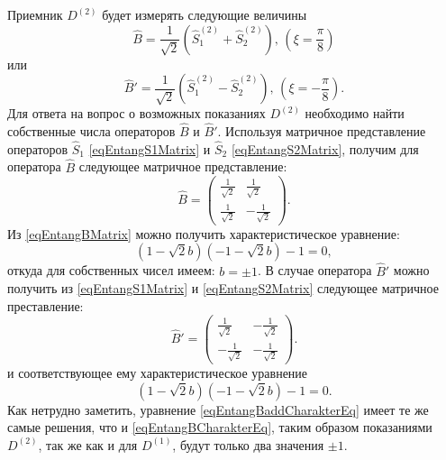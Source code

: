 Приемник $D^{(2)}$ будет измерять следующие величины 
\[
\hat{B} = \frac{1}{\sqrt{2}}\left(\hat{S}_1^{(2)} + \hat{S}_2^{(2)}\right),\,(\xi =
\frac{\pi}{8}) 
\]
или 
\[
\hat{B}' = \frac{1}{\sqrt{2}}\left(\hat{S}_1^{(2)} - \hat{S}_2^{(2)}\right),\,(\xi =
- \frac{\pi}{8}).
\]
Для ответа на вопрос о возможных показаниях $D^{(2)}$ необходимо найти
собственные числа операторов $\hat{B}$ и $\hat{B}'$. Используя
матричное представление операторов $\hat{S}_1$
\eqref{eqEntangS1Matrix} и $\hat{S}_2$ \eqref{eqEntangS2Matrix},
получим для оператора $\hat{B}$ следующее матричное представление:
\begin{equation}
\hat{B} = 
\left(
\begin{array}{cc}
\frac{1}{\sqrt{2}} & \frac{1}{\sqrt{2}} \\
\frac{1}{\sqrt{2}} & -\frac{1}{\sqrt{2}} 
\end{array}
\right).
\label{eqEntangBMatrix}
\end{equation}
Из \eqref{eqEntangBMatrix} можно получить характеристическое
уравнение:
\begin{equation}
\left(1 -\sqrt{2} b\right)\left(- 1 -\sqrt{2} b\right) -1 = 0,
\label{eqEntangBCharakterEq}
\end{equation}
откуда для собственных чисел имеем: $b = \pm 1$. В случае оператора
$\hat{B}'$  можно получить из \eqref{eqEntangS1Matrix} и
\eqref{eqEntangS2Matrix} следующее матричное преставление:
\begin{equation}
\hat{B}' = 
\left(
\begin{array}{cc}
\frac{1}{\sqrt{2}} & -\frac{1}{\sqrt{2}} \\
-\frac{1}{\sqrt{2}} & -\frac{1}{\sqrt{2}} 
\end{array}
\right).
\label{eqEntangBaddMatrix}
\end{equation}
и соответствующее ему характеристическое уравнение
\begin{equation}
\left(1 -\sqrt{2} b\right)\left(- 1 -\sqrt{2} b\right) -1 = 0.
\label{eqEntangBaddCharakterEq}
\end{equation}
Как нетрудно заметить, уравнение \eqref{eqEntangBaddCharakterEq} имеет
те же самые решения, что и \eqref{eqEntangBCharakterEq}, таким образом
показаниями $D^{(2)}$, так же как и для $D^{(1)}$, будут только два
значения $\pm 1$.

